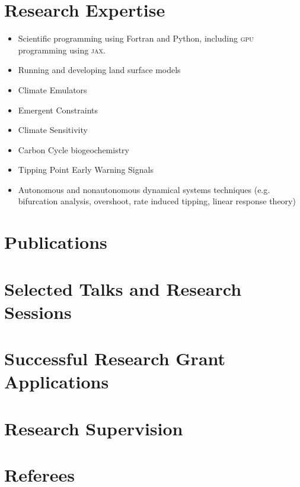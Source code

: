 \documentclass{cvjc}
\begin{document}
\section{Research Expertise}
\begin{itemize}
\item Scientific programming using Fortran and Python, including \textsc{gpu} programming using \textsc{jax}.
\item Running and developing land surface models
\item Climate Emulators
\item Emergent Constraints
\item Climate Sensitivity
\item Carbon Cycle biogeochemistry
\item Tipping Point Early Warning Signals
\item Autonomous and nonautonomous dynamical systems techniques (e.g. bifurcation analysis, overshoot, rate induced tipping, linear response theory)
\end{itemize}

\section{Publications}
\printpublications

\section{Selected Talks and Research Sessions}
\printtalks

\section{Successful Research Grant Applications}
\begin{events}
\end{events}

\section{Research Supervision}
\begin{events}
\end{events}
\section{Referees}
\begin{contact}
\end{contact}
\end{document}
